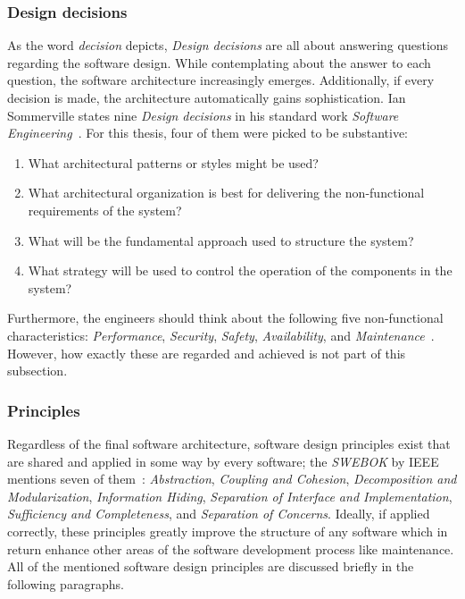 \documentclass[12pt,a4paper]{report}
\begin{document}
\subsubsection{Design decisions}

As the word \textit{decision} depicts, \textit{Design decisions} are all about
answering questions regarding the software design. While contemplating about
the answer to each question, the software architecture increasingly emerges.
Additionally, if every decision is made, the architecture automatically gains
sophistication. Ian Sommerville states nine \textit{Design decisions} in his
standard work \textit{Software Engineering}~\cite{sommerville-se}.
For this thesis, four of them were picked to be substantive:
\begin{enumerate}
\item What architectural patterns or styles might be used?
\item What architectural organization is best for delivering the non-functional requirements of the system?
\item What will be the fundamental approach used to structure the system?
\item What strategy will be used to control the operation of the components in the system?
\end{enumerate}
Furthermore, the engineers should think about the following five non-functional characteristics:
\textit{Performance}, \textit{Security}, \textit{Safety}, \textit{Availability},
and \textit{Maintenance}~\cite{sommerville-se}. However, how exactly these are
regarded and achieved is not part of this subsection.


\subsubsection{Principles}

Regardless of the final software architecture, software design principles exist
that are shared and applied in some way by every software; the \textit{SWEBOK} by IEEE
mentions seven of them~\cite{swebok}: \textit{Abstraction}, \textit{Coupling and Cohesion},
\textit{Decomposition and Modularization}, \textit{Information Hiding},
\textit{Separation of Interface and Implementation},
\textit{Sufficiency and Completeness}, and \textit{Separation of Concerns}.
Ideally, if applied correctly, these principles greatly improve the structure
of any software which in return enhance other areas of the
software development process like maintenance. All of the mentioned
software design principles are discussed briefly in the following paragraphs.
\end{document}
